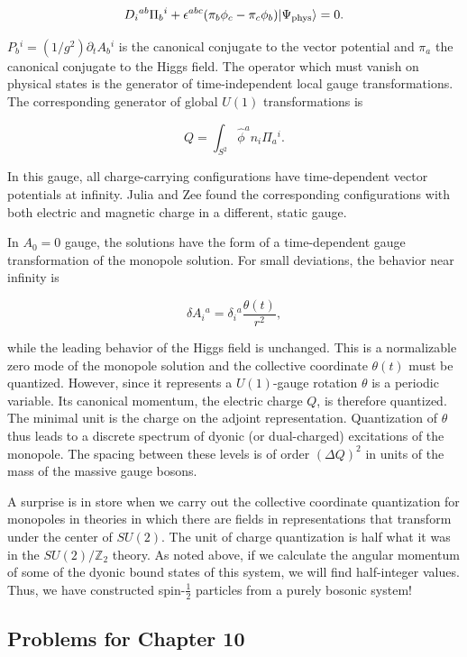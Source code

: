 \[
  D_i{}^{ab}\Pi_b{}^i+\epsilon^{abc}(\pi_b\phi_c-\pi_c\phi_b)
  \lvert \Psi_{\rm phys}\rangle=0.
\]

$P_b{}^i=(1/g^2)\partial_tA_b{}^i$ is the canonical conjugate to the vector
potential and $\pi_a$ the canonical conjugate to the Higgs field. The operator
which must vanish on physical states is the generator of time-independent local
gauge transformations. The corresponding generator of global $U(1)$
transformations is

\[
  Q=\int_{S^2}\hat\phi^a n_i\Pi_a{}^i.
\]

In this gauge, all charge-carrying configurations have time-dependent vector
potentials at infinity. Julia and Zee \cite{banks-ref-148} found the corresponding
configurations with both electric and magnetic charge in a different, static
gauge.

In $A_0=0$ gauge, the solutions have the form of a time-dependent gauge
transformation of the monopole solution. For small deviations, the behavior near
infinity is

\[
  \delta A_i{}^a=\delta_i{}^a\frac{\theta(t)}{r^2},
\]

while the leading behavior of the Higgs field is unchanged. This is a normalizable
zero mode of the monopole solution and the collective coordinate $\theta(t)$
must be quantized. However, since it represents a $U(1)$-gauge rotation $\theta$
is a periodic variable. Its canonical momentum, the electric charge $Q$, is
therefore quantized. The minimal unit is the charge on the adjoint
representation. Quantization of $\theta$ thus leads to a discrete spectrum of
dyonic (or dual-charged) excitations of the monopole. The spacing between these
levels is of order $(\Delta Q)^2$ in units of the mass of the massive gauge
bosons.

A surprise is in store \cite{banks-ref-149,banks-ref-150} when we carry out the
collective coordinate quantization for monopoles in theories in which there are
fields in representations that transform under the center of $SU(2)$. The unit
of charge quantization is half what it was in the $SU(2)/\mathbb Z_2$ theory. As
noted above, if we calculate the angular momentum of some of the dyonic bound
states of this system, we will find half-integer values. Thus, we have
constructed spin-$\tfrac12$ particles from a purely bosonic system!

\subsection{Problems for Chapter 10}
